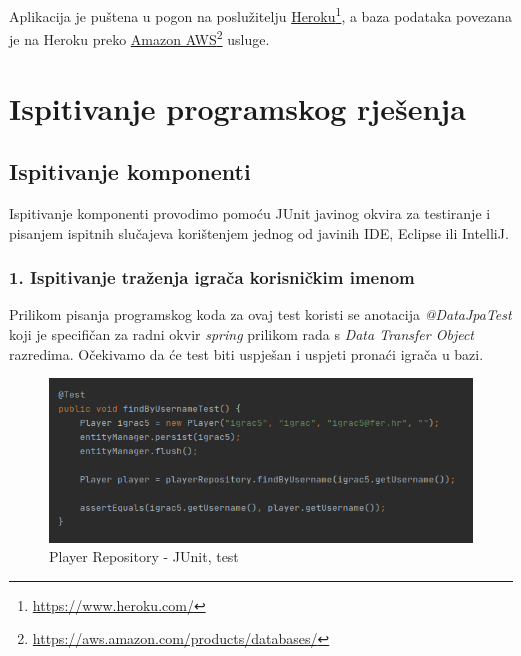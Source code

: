 			{Aplikacija je puštena u pogon na poslužitelju \underline{Heroku}\footnote{\url{https://www.heroku.com/}}, a baza podataka povezana je na Heroku preko \underline{Amazon AWS}\footnote{\url{https://aws.amazon.com/products/databases/}} usluge.}
			\eject 
		
	
		\section{Ispitivanje programskog rješenja}
			
%			
	
			
			\subsection{Ispitivanje komponenti}

			{Ispitivanje komponenti provodimo pomoću JUnit javinog okvira za testiranje i pisanjem ispitnih slučajeva korištenjem jednog od javinih IDE, Eclipse ili IntelliJ.}
			
				\subsubsection {1. Ispitivanje traženja igrača korisničkim imenom}
				
					{Prilikom pisanja programskog koda za ovaj test koristi se anotacija \textit{@DataJpaTest} koji je specifičan za radni okvir \textit{spring} prilikom rada s \textit{Data Transfer Object} razredima. Očekivamo da će test biti uspješan i uspjeti pronaći igrača u bazi.}
					
						\begin{figure}[H]
							\includegraphics[width=\textwidth]{slike/playerFindByUsernameTest} 
							\centering
							\caption{Player Repository - JUnit, test}
							\label{}
						\end{figure}
					
